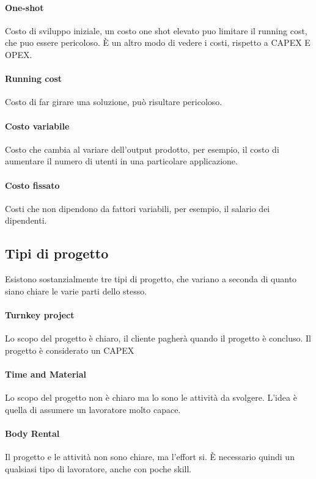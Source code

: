 \paragraph{One-shot}
Costo di sviluppo iniziale, un costo one shot elevato puo limitare il running cost, 
che puo essere pericoloso.
È un altro modo di vedere i costi, rispetto a CAPEX E OPEX.

\paragraph{Running cost}
Costo di far girare una soluzione, può risultare pericoloso.

\paragraph{Costo variabile}
Costo che cambia al variare dell'output prodotto, per esempio, 
il costo di aumentare il numero di utenti in una particolare applicazione.

\paragraph{Costo fissato}
Costi che non dipendono da fattori variabili, per esempio, il salario dei dipendenti.

\subsection{Tipi di progetto}
Esistono sostanzialmente tre tipi di progetto, che variano a seconda di quanto
siano chiare le varie parti dello stesso.

\paragraph{Turnkey project}
Lo scopo del progetto è chiaro, il cliente pagherà quando il progetto è 
concluso. Il progetto è considerato un CAPEX

\paragraph{Time and Material}
Lo scopo del progetto non è chiaro ma lo sono le attività da svolgere.
L'idea è quella di assumere un lavoratore molto capace.

\paragraph{Body Rental}
Il progetto e le attività non sono chiare, ma l'effort si.
È necessario quindi un qualsiasi tipo di lavoratore, anche con poche skill.

